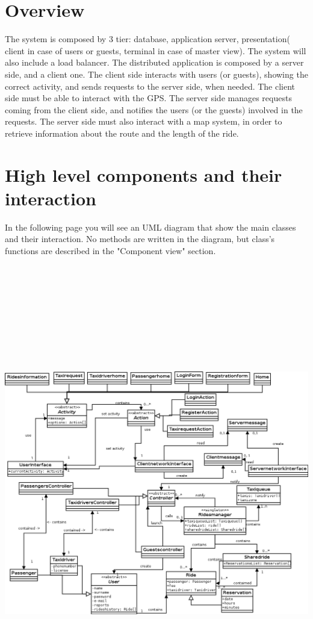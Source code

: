 \section{Overview}
The system is composed by 3 tier: database, application server, presentation( client in case of users or guests, terminal in case of master view).
The system will also include a load balancer.
The distributed application is composed by a server side, and a client one.
The client side interacts with users (or guests), showing the correct activity, and sends requests to the server side, when needed.
The client side must be able to interact with the GPS.
The server side manages requests coming from the client side, and notifies the users (or the guests) involved in the requests.
The server side must also interact with a map system, in order to retrieve information about the route and the length of the ride.
\section{High level components and their interaction}
In the following page you will see an UML diagram that show the main classes and their interaction. No methods are written in the diagram, but
class's functions are described in the "Component view" section.
\newpage
\begin{center}
\hspace*{-2cm}
 \includegraphics[height=20cm, width=18cm]{UML/Diagramma1.png}
\end{center}

